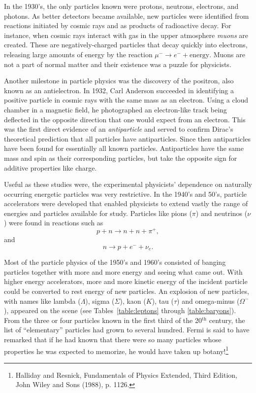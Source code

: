 In the 1930's, the only particles known were protons, neutrons,
electrons, and photons.  As better detectors became available, new
particles were identified from reactions initiated by cosmic rays and
as products of radioactive decay.  For instance, when cosmic rays
interact with gas in the upper atmosphere {\em muons} are created.
These are negatively-charged particles that decay quickly into electrons,
releasing large amounts of energy by the reaction 
$\mu^- \to e^- + \mbox{energy}$.  
Muons are not a part of normal matter and their existence
was a puzzle for physicists.

Another milestone in particle physics was the discovery of the
positron, also known as an antielectron.  In 1932, Carl Anderson
succeeded in identifying a positive particle in cosmic rays with the
same mass as an electron.  Using a cloud chamber in a magnetic field,
he photographed an electron-like track being deflected in the opposite
direction that one would expect from an electron.  This was the first
direct evidence of an {\em antiparticle} and served to confirm Dirac's
theoretical prediction that all particles have antiparticles.  Since
then antiparticles have been found for essentially all known
particles.  Antiparticles have the same mass and spin as their
corresponding particles, but take the opposite sign for additive
properties like charge.

Useful as these studies were, the experimental physicists' dependence
on naturally occurring energetic particles was very restrictive.  In
the 1940's and 50's, particle accelerators were developed that enabled
physicists to extend vastly the range of energies and particles
available for study.  Particles like pions ($\pi$) and neutrinos
($\nu$) were found in reactions such as
\begin{equation}
p + n \to n + n + \pi^+,
\end{equation}
and
\begin{equation}
n \to p + e^- + \nu_e.
\end{equation}

Most of the particle physics of the 1950's and 1960's consisted of banging
particles together with more and more energy and seeing what came out.
With higher energy accelerators, more and more kinetic energy of the
incident particle could be converted to rest energy of new particles.
An explosion of new particles, with names like lambda ($\Lambda$),
sigma ($\Sigma$), kaon ($K$), tau ($\tau$) and omega-minus
($\Omega^-$), appeared on the scene (see Tables~\ref{table:leptons}
through \ref{table:baryons}).  From the three or four particles known in
the first third of the 20$^\text{th}$ century, the list of ``elementary'' 
particles
had grown to several hundred.  Fermi is said to have remarked that if
he had known that there were so many particles whose properties he was
expected to memorize, he would have taken up botany!\footnote{Halliday
and Resnick, Fundamentals of Physics Extended, Third Edition, John
Wiley and Sons (1988), p. 1126.}


